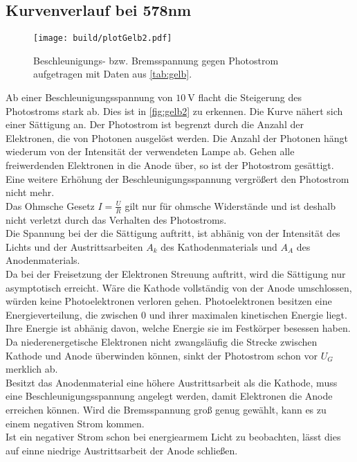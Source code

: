 \newpage

\subsection{Kurvenverlauf bei 578nm}

\begin{figure}[H]
  \centering
  \texttt{[image: build/plotGelb2.pdf]}
  \caption{Beschleunigungs- bzw. Bremsspannung gegen Photostrom aufgetragen mit Daten aus \autoref{tab:gelb}.}
  \label{fig:gelb2}
\end{figure}

Ab einer Beschleunigungsspannung von $\SI{10}{\volt}$ flacht die Steigerung des Photostroms stark ab.
Dies ist in \autoref{fig:gelb2} zu erkennen. Die Kurve nähert sich einer Sättigung an.
Der Photostrom ist begrenzt durch die Anzahl der Elektronen, die von Photonen ausgelöst werden.
Die Anzahl der Photonen hängt wiederum von der Intensität der verwendeten Lampe ab.
Gehen alle freiwerdenden Elektronen in die Anode über, so ist der Photostrom gesättigt.
Eine weitere Erhöhung der Beschleunigungsspannung vergrößert den Photostrom nicht mehr.
\\
Das Ohmsche Gesetz $I = \frac{U}{R}$ gilt nur für ohmsche Widerstände und ist deshalb nicht verletzt durch das Verhalten des Photostroms.
\\
Die Spannung bei der die Sättigung auftritt, ist abhänig von der Intensität des Lichts und der Austrittsarbeiten $A_k$ des Kathodenmaterials
und $A_A$ des Anodenmaterials.\\
Da bei der Freisetzung der Elektronen Streuung auftritt, wird die Sättigung nur asymptotisch erreicht.
Wäre die Kathode vollständig von der Anode umschlossen, würden keine Photoelektronen verloren gehen.
Photoelektronen besitzen eine Energieverteilung, die zwischen $0$ und ihrer maximalen kinetischen Energie liegt.
Ihre Energie ist abhänig davon, welche Energie sie im Festkörper besessen haben.
Da niederenergetische Elektronen nicht zwangsläufig die Strecke zwischen Kathode und Anode überwinden können,
sinkt der Photostrom schon vor $U_G$ merklich ab.\\
Besitzt das Anodenmaterial eine höhere Austrittsarbeit als die Kathode,
muss eine Beschleunigungsspannung angelegt werden, damit Elektronen die Anode erreichen können.
Wird die Bremsspannung groß genug gewählt, kann es zu einem negativen Strom kommen.\\
Ist ein negativer Strom schon bei energiearmem Licht zu beobachten, lässt dies auf einne niedrige Austrittsarbeit der Anode schließen.\\
